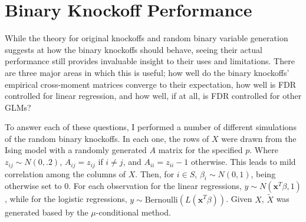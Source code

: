 \documentclass[11pt]{article}
\theoremstyle{definition}
\begin{document}
\section{Binary Knockoff Performance}
    While the theory for original knockoffs and random binary variable generation suggests at how the binary knockoffs should behave, seeing their actual performance still provides invaluable insight to their uses and limitations. There are three major areas in which this is useful; how well do the binary knockoffs' empirical cross-moment matrices converge to their expectation, how well is FDR controlled for linear regression, and how well, if at all, is FDR controlled for other GLMs? \par
    To answer each of these questions, I performed a number of different simulations of the random binary knockoffs. In each one, the rows of $X$ were drawn from the Ising model with a randomly generated $A$ matrix for the specified $p$. Where $z_{ij}\sim N(0,.2)$, $A_{ij}=z_{ij}$ if $i\neq j$, and $A_{ii}=z_{ii}-1$ otherwise. This leads to mild correlation among the columns of $X$. Then, for $i\in S$, $\beta_i\sim N(0,1)$, being otherwise set to $0$. For each observation for the linear regressions, $y\sim N(\mathbf{x}^T\beta,1)$, while for the logistic regressions, $y\sim \textrm{Bernoulli}(L(\mathbf{x}^T\beta))$. Given $X$, $\tilde X$ was generated based by the $\mu$-conditional method.
\end{document}
